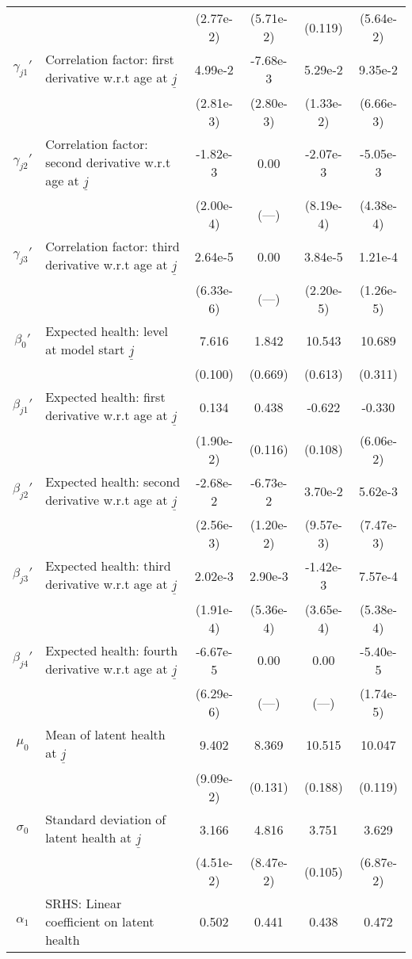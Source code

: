 \begin{table}[H]
\begin{center}
{\begin{tabular}{clcccc}
 & & (2.77e-2) & (5.71e-2) & (0.119) & (5.64e-2) \\
$\gamma_{j1}'$ & Correlation factor: first derivative w.r.t age at $\underline{j}$ & 4.99e-2 & -7.68e-3 & 5.29e-2 & 9.35e-2 \\
 & & (2.81e-3) & (2.80e-3) & (1.33e-2) & (6.66e-3) \\
$\gamma_{j2}'$ & Correlation factor: second derivative w.r.t age at $\underline{j}$ & -1.82e-3 & 0.00 & -2.07e-3 & -5.05e-3 \\
 & & (2.00e-4) & (---) & (8.19e-4) & (4.38e-4) \\
$\gamma_{j3}'$ & Correlation factor: third derivative w.r.t age at $\underline{j}$ & 2.64e-5 & 0.00 & 3.84e-5 & 1.21e-4 \\
 & & (6.33e-6) & (---) & (2.20e-5) & (1.26e-5) \\
$\beta_{0}'$ & Expected health: level at model start $\underline{j}$ & 7.616 & 1.842 & 10.543 & 10.689 \\
 & & (0.100) & (0.669) & (0.613) & (0.311) \\
$\beta_{j1}'$ & Expected health: first derivative w.r.t age at $\underline{j}$ & 0.134 & 0.438 & -0.622 & -0.330 \\
 & & (1.90e-2) & (0.116) & (0.108) & (6.06e-2) \\
$\beta_{j2}'$ & Expected health: second derivative w.r.t age at $\underline{j}$ & -2.68e-2 & -6.73e-2 & 3.70e-2 & 5.62e-3 \\
 & & (2.56e-3) & (1.20e-2) & (9.57e-3) & (7.47e-3) \\
$\beta_{j3}'$ & Expected health: third derivative w.r.t age at $\underline{j}$ & 2.02e-3 & 2.90e-3 & -1.42e-3 & 7.57e-4 \\
 & & (1.91e-4) & (5.36e-4) & (3.65e-4) & (5.38e-4) \\
$\beta_{j4}'$ & Expected health: fourth derivative w.r.t age at $\underline{j}$ & -6.67e-5 & 0.00 & 0.00 & -5.40e-5 \\
 & & (6.29e-6) & (---) & (---) & (1.74e-5) \\
$\mu_0$ & Mean of latent health at $\underline{j}$ & 9.402 & 8.369 & 10.515 & 10.047 \\
 & & (9.09e-2) & (0.131) & (0.188) & (0.119) \\
$\sigma_{0}$ & Standard deviation of latent health at $\underline{j}$ & 3.166 & 4.816 & 3.751 & 3.629 \\
 & & (4.51e-2) & (8.47e-2) & (0.105) & (6.87e-2) \\
$\alpha_1$ & SRHS: Linear coefficient on latent health & 0.502 & 0.441 & 0.438 & 0.472 \\

\end{tabular}}
\end{center}
\end{table}
